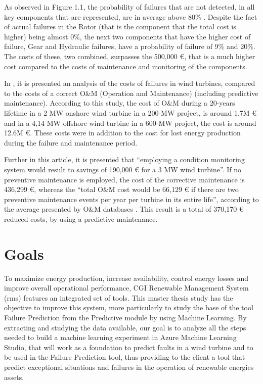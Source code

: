 As observed in Figure 1.1, the probability of failures that are not detected, in all key components that are represented, are in average above 80\% . Despite the fact of actual failures in the Rotor (that is the component that the total cost is higher) being almost 0\%, the next two components that have the higher cost of failure, Gear and Hydraulic failures, have a probability of failure of 9\%  and 20\%. The costs of these, two combined, surpasses the 500,000 €, that is a much higher cost compared to the costs of maintenance and monitoring of the components.


In \cite{OLD_53_WIND}, it is presented an analysis of the costs of failures in wind turbines, compared to the costs of a correct O&M (Operation and Maintenance) (including predictive maintenance). According to this study, the cost of O\&M during a 20-years lifetime in a 2 MW onshore wind turbine in a 200-MW project, is around 1.7M € and in a 4,14 MW offshore wind turbine in a 600-MW project, the cost is around 12.6M €. These costs were in addition to the cost for lost energy production during the failure and maintenance period.

Further in this article, it is presented that “employing a condition monitoring system would result to savings of 190,000 € for a 3 MW wind turbine”. If no preventive maintenance is employed, the cost of the corrective maintenance is 436,299 €, whereas the “total O\&M cost would be 66,129 € if there are two preventive maintenance events per year per turbine in its entire life”, according to the average presented by O&M databases \cite{OLD_53_WIND}. This result is a total of 370,170 € reduced costs, by using a predictive maintenance.

\section{Goals} 
\label{sub:if_you_use_this_template} 

To maximize energy production, increase availability, control energy losses and improve overall operational performance, CGI Renewable Management System (\acrshort{rms}) \cite{OLD_8} features an integrated set of tools. This master thesis study has the objective to improve this system, more particularly to study the base of the tool Failure Prediction from the Predictive module by using Machine Learning. By extracting and studying the data available, our goal is to analyze all the steps needed to build a machine learning experiment in Azure Machine Learning Studio, that will work as a foundation to predict faults in a wind turbine and to be used in the Failure Prediction tool, thus providing to the client a tool that predict exceptional situations and failures in the operation of renewable energies assets.

